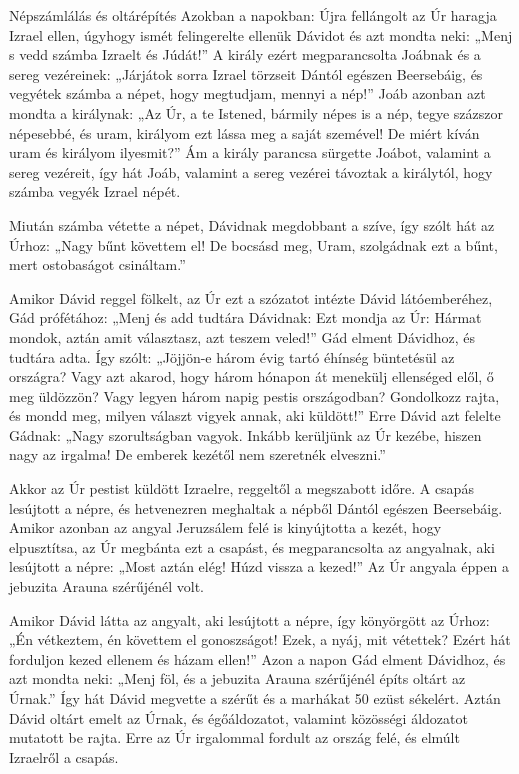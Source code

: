\documentclass[twoside]{article}
\begin{document}
\begin{lectio}{Népszámlálás és oltárépítés}
\noindent Azokban a napokban: Újra fellángolt az Úr haragja Izrael ellen, úgyhogy ismét felingerelte ellenük Dávidot és azt mondta neki: „Menj s vedd számba Izraelt és Júdát!” A király ezért megparancsolta Joábnak és a sereg vezéreinek: „Járjátok sorra Izrael törzseit Dántól egészen Beersebáig, és vegyétek számba a népet, hogy megtudjam, mennyi a nép!” Joáb azonban azt mondta a királynak: „Az Úr, a te Istened, bármily népes is a nép, tegye százszor népesebbé, és uram, királyom ezt lássa meg a saját szemével! De miért kíván uram és királyom ilyesmit?” Ám a király parancsa sürgette Joábot, valamint a sereg vezéreit, így hát Joáb, valamint a sereg vezérei távoztak a királytól, hogy számba vegyék Izrael népét.

Miután számba vétette a népet, Dávidnak megdobbant a szíve, így szólt hát az Úrhoz: „Nagy bűnt követtem el! De bocsásd meg, Uram, szolgádnak ezt a bűnt, mert ostobaságot csináltam.”

Amikor Dávid reggel fölkelt, az Úr ezt a szózatot intézte Dávid látóemberéhez, Gád prófétához: „Menj és add tudtára Dávidnak: Ezt mondja az Úr: Hármat mondok, aztán amit választasz, azt teszem veled!” Gád elment Dávidhoz, és tudtára adta. Így szólt: „Jöjjön-e három évig tartó éhínség büntetésül az országra? Vagy azt akarod, hogy három hónapon át menekülj ellenséged elől, ő meg üldözzön? Vagy legyen három napig pestis országodban? Gondolkozz rajta, és mondd meg, milyen választ vigyek annak, aki küldött!” Erre Dávid azt felelte Gádnak: „Nagy szorultságban vagyok. Inkább kerüljünk az Úr kezébe, hiszen nagy az irgalma! De emberek kezétől nem szeretnék elveszni.”

Akkor az Úr pestist küldött Izraelre, reggeltől a megszabott időre. A csapás lesújtott a népre, és hetvenezren meghaltak a népből Dántól egészen Beersebáig. Amikor azonban az angyal Jeruzsálem felé is kinyújtotta a kezét, hogy elpusztítsa, az Úr megbánta ezt a csapást, és megparancsolta az angyalnak, aki lesújtott a népre: „Most aztán elég! Húzd vissza a kezed!” Az Úr angyala éppen a jebuzita Arauna szérűjénél volt.

Amikor Dávid látta az angyalt, aki lesújtott a népre, így könyörgött az Úrhoz: „Én vétkeztem, én követtem el gonoszságot! Ezek, a nyáj, mit vétettek? Ezért hát forduljon kezed ellenem és házam ellen!” Azon a napon Gád elment Dávidhoz, és azt mondta neki: „Menj föl, és a jebuzita Arauna szérűjénél építs oltárt az Úrnak.” Így hát Dávid megvette a szérűt és a marhákat 50 ezüst sékelért. Aztán Dávid oltárt emelt az Úrnak, és égőáldozatot, valamint közösségi áldozatot mutatott be rajta. Erre az Úr irgalommal fordult az ország felé, és elmúlt Izraelről a csapás.
\end{lectio}
\end{document}
